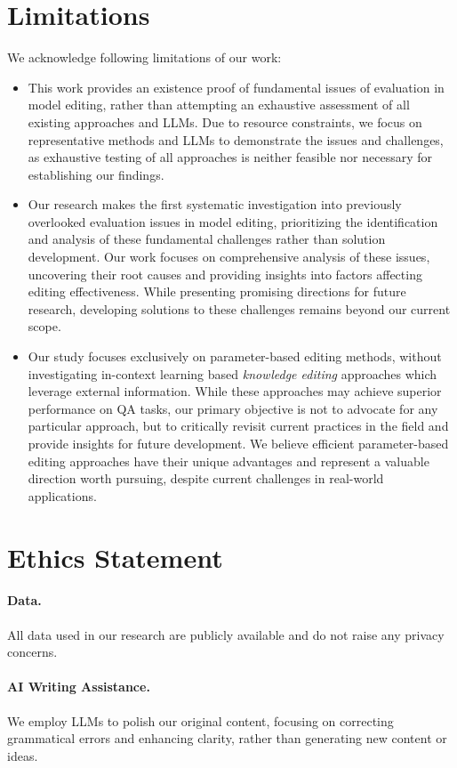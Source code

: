 \section*{Limitations}
We acknowledge following limitations of our work:
\begin{itemize}[leftmargin=11pt, itemsep=2pt, topsep=2pt]
    \item This work provides an existence proof of fundamental issues of evaluation in model editing, rather than attempting an exhaustive assessment of all existing approaches and LLMs.
    Due to resource constraints, we focus on representative methods and LLMs to demonstrate the issues and challenges, as exhaustive testing of all approaches is neither feasible nor necessary for establishing our findings.
    \item Our research makes the first systematic investigation into previously overlooked evaluation issues in model editing, prioritizing the identification and analysis of these fundamental challenges rather than solution development.
    Our work focuses on comprehensive analysis of these issues, uncovering their root causes and providing insights into factors affecting editing effectiveness. While presenting promising directions for future research, developing solutions to these challenges remains beyond our current scope.
    \item Our study focuses exclusively on parameter-based editing methods, without investigating in-context learning based \textit{knowledge editing} approaches which leverage external information.
    While these approaches may achieve superior performance on QA tasks, our primary objective is not to advocate for any particular approach, but to critically revisit current practices in the field and provide insights for future development. 
    We believe efficient parameter-based editing approaches have their unique advantages and represent a valuable direction worth pursuing, despite current challenges in real-world applications.
\end{itemize}



\section*{Ethics Statement}

\paragraph{Data.}
All data used in our research are publicly available and do not raise any privacy concerns.

\paragraph{AI Writing Assistance.}
We employ LLMs to polish our original content, focusing on correcting grammatical errors and enhancing clarity, rather than generating new content or ideas.
